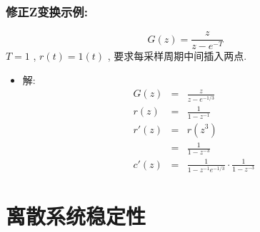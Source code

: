 \documentclass[table]{beamer}
\begin{document}
\begin{frame}
\frametitle{修正Z变换示例:}
\label{sec-4-5-3}

\[G(z)=\frac{z}{z-e^{-T}}\]
   $T=1$ ,  $r(t)=1(t)$ , 要求每采样周期中间插入两点.

\begin{itemize}
\item 解:
      \begin{eqnarray*}
      G(z) &= & \frac{z}{z-e^{-1/3}} \\
      r(z) &=& \frac{1}{1-z^{-1}} \\
      r'(z) &=& r(z^3) \\
      &=& \frac{1}{1-z^{-3}} \\
      c'(z) &=& \frac{1}{1-z^{-1}e^{-1/3}}\cdot\frac{1}{1-z^{-3}}
      \end{eqnarray*}
\end{itemize}
\end{frame}
\section{离散系统稳定性}
\label{sec-5}
\end{document}

